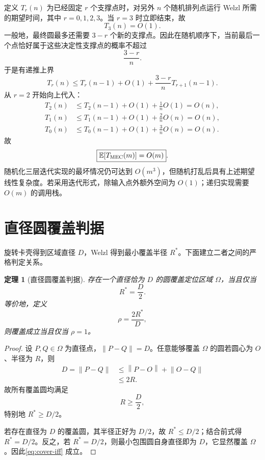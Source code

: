 \documentclass[UTF8,12pt,a4paper]{ctexart}
\newtheorem{theorem}{定理}[section]
\theoremstyle{definition}
\newcommand{\norm}[1]{\left\lVert #1\right\rVert}
\begin{document}
定义 $T_r(n)$ 为已经固定 $r$ 个支撑点时，对另外 $n$ 个随机排列点运行 Welzl 所需的期望时间，其中 $r=0,1,2,3$。当 $r=3$ 时立即结束，故
\begin{equation}
T_3(n)=O(1).
\end{equation}
一般地，最终圆最多还需要 $3-r$ 个新的支撑点。因此在随机顺序下，当前最后一个点恰好属于这些决定性支撑点的概率不超过
\begin{equation}
\frac{3-r}{n}.
\end{equation}
于是有递推上界
\begin{equation}
T_r(n)
\le
T_r(n-1)+O(1)+\frac{3-r}{n}T_{r+1}(n-1).
\label{eq:welzl-rec-complexity}
\end{equation}
从 $r=2$ 开始向上代入：
\begin{align}
T_2(n)&\le T_2(n-1)+O(1)+\frac1nO(1)=O(n),\\
T_1(n)&\le T_1(n-1)+O(1)+\frac2nO(n)=O(n),\\
T_0(n)&\le T_0(n-1)+O(1)+\frac3nO(n)=O(n).
\end{align}
故
\begin{equation}
\boxed{\mathbb E[T_{\rm MEC}(m)]=O(m)}.
\end{equation}
随机化三层迭代实现的最坏情况仍可达到 $O(m^3)$，但随机打乱后具有上述期望线性复杂度。若采用迭代形式，除输入点外额外空间为 $O(1)$；递归实现需要 $O(m)$ 的调用栈。

\section{直径圆覆盖判据}

旋转卡壳得到区域直径 $D$，Welzl 得到最小覆盖半径 $R^*$。下面建立二者之间的严格判定关系。

\begin{theorem}[直径圆覆盖判据]
存在一个直径恰为 $D$ 的圆覆盖定位区域 $\Omega$，当且仅当
\begin{equation}
\boxed{R^*=\frac{D}{2}}.
\label{eq:cover-iff}
\end{equation}
等价地，定义
\begin{equation}
\rho=\frac{2R^*}{D},
\label{eq:rho}
\end{equation}
则覆盖成立当且仅当 $\rho=1$。
\end{theorem}
\begin{proof}
设 $P,Q\in\Omega$ 为直径点，$\norm{P-Q}=D$。任意能够覆盖 $\Omega$ 的圆若圆心为 $O$、半径为 $R$，则
\begin{align}
D=\norm{P-Q}
&\le\norm{P-O}+\norm{O-Q}\\
&\le2R.
\end{align}
故所有覆盖圆均满足
\begin{equation}
R\ge\frac D2,
\end{equation}
特别地 $R^*\ge D/2$。

若存在直径为 $D$ 的覆盖圆，其半径正好为 $D/2$，故 $R^*\le D/2$；结合前式得 $R^*=D/2$。反之，若 $R^*=D/2$，则最小包围圆自身直径即为 $D$，它显然覆盖 $\Omega$。因此\cref{eq:cover-iff} 成立。
\end{proof}
\end{document}

